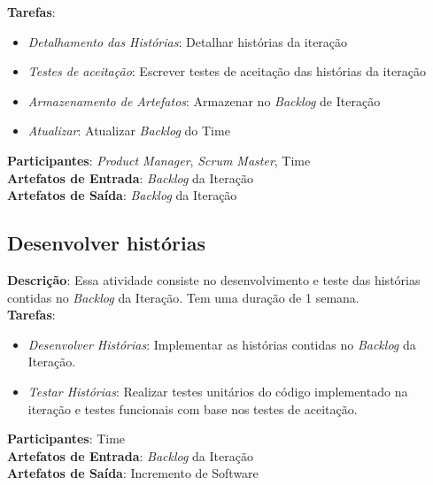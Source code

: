  \textbf{Tarefas}:
  \begin{itemize}
   \item \indent \textit{Detalhamento das Histórias}: Detalhar histórias da iteração
   
   \item \indent \textit{Testes de aceitação}: Escrever testes de aceitação das histórias da iteração

   \item \indent \textit{Armazenamento de Artefatos}: Armazenar no \textit{Backlog} de Iteração

   \item \indent \textit{Atualizar}: Atualizar \textit{Backlog} do Time
  \end{itemize}

  \textbf{Participantes}: \textit{Product Manager}, \textit{Scrum Master}, Time\\

  \textbf{Artefatos de Entrada}: \textit{Backlog} da Iteração \\

  \textbf{Artefatos de Saída}:   \textit{Backlog} da Iteração\\

\subsection{Desenvolver histórias}
  \textbf{Descrição}: Essa atividade consiste no desenvolvimento e teste das histórias contidas no \textit{Backlog} da Iteração. Tem uma duração de 1 semana. \\

  \textbf{Tarefas}:

  \begin{itemize}
    \item \indent \textit{Desenvolver Histórias}: Implementar as histórias contidas no \textit{Backlog} da Iteração.

   \item \indent \textit{Testar Histórias}: Realizar testes unitários do código implementado na iteração e testes funcionais
   com base nos testes de aceitação.
  \end{itemize}

  \textbf{Participantes}: Time\\

  \textbf{Artefatos de Entrada}: \textit{Backlog} da Iteração \\

  \textbf{Artefatos de Saída}:   Incremento de Software\\

